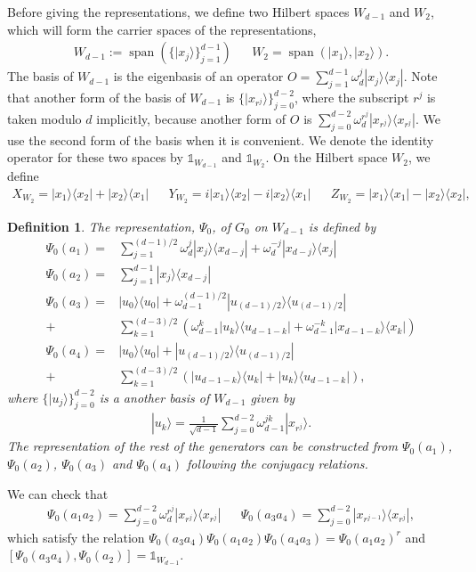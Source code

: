 \documentclass[11pt,letterpaper]{article}
\newcommand{\ket}[1]{|#1\rangle}
\newcommand{\ketbra}[2]{|#1\rangle\langle#2|}
\DeclareMathOperator{\spn}{span}
\newcommand{\1}{\mathbb{1}}
\newtheorem{definition}[theorem]{Definition}
\theoremstyle{definition}
\begin{document}
Before giving the representations, we define two Hilbert spaces $W_{d-1}$ and $W_2$, which will form the carrier spaces
of the representations,
\begin{align}
	\label{eq:w_subspace}
	W_{d-1} := \spn(\{\ket{x_j}\}_{j=1}^{d-1}) && W_2 = \spn(\ket{x_1}, \ket{x_2}).
\end{align}
The basis of $W_{d-1}$ is the eigenbasis of an operator $O = \sum_{j=1}^{d-1} \omega_d^j \ketbra{x_j}{x_j}$.
Note that another form of the basis of $W_{d-1}$ is $\{\ket{x_{r^j}}\}_{j=0}^{d-2}$, where the subscript $r^j$ is taken
modulo $d$ implicitly,
because another form of $O$ is $\sum_{j=0}^{d-2} \omega_d^{r^j} \ketbra{x_{r^j}}{x_{r^j}}$.
We use the second form of the basis when it is convenient.
We denote the identity operator for these two spaces by $\1_{W_{d-1}}$ and $\1_{W_2}$.
On the Hilbert space $W_2$, we define
\begin{align*}
	X_{W_2} = \ketbra{x_1}{x_2} + \ketbra{x_2}{x_1} &&
	Y_{W_2} = i\ketbra{x_1}{x_2} - i \ketbra{x_2}{x_1} &&
	Z_{W_2} = \ketbra{x_1}{x_1} - \ketbra{x_2}{x_2},
\end{align*}
\begin{definition}
The representation, $\Psi_0$, of $G_0$ on $W_{d-1}$ is defined by
\begin{align*}
	\Psi_0(a_1) =&\sum_{j=1}^{(d-1)/2} \omega_d^j \ketbra{x_j}{x_{d-j}} + \omega_d^{-j} \ketbra{x_{d-j}}{x_{j}} \\
	\Psi_0(a_2) = &\sum_{j=1}^{d-1} \ketbra{x_j}{x_{d-j}}\\
	\Psi_0(a_3) = &\ketbra{u_0}{u_0} +\omega_{d-1}^{(d-1)/2}\ketbra{u_{(d-1)/2}}{u_{(d-1)/2}}\\ + 
	&\sum_{k=1}^{(d-3)/2}\left( \omega_{d-1}^k\ketbra{u_k}{u_{d-1-k}} + \omega_{d-1}^{-k}\ketbra{x_{d-1-k}}{x_k}\right)\\ 
	\Psi_0(a_4) = &\ketbra{u_0}{u_0} +\ketbra{u_{(d-1)/2}}{u_{(d-1)/2}} \\+
	 &\sum_{k=1}^{(d-3)/2}\left(\ketbra{u_{d-1-k}}{u_k} + \ketbra{u_k}{u_{d-1-k}}\right),
\end{align*}
where $\{ \ket{u_j} \}_{j=0}^{d-2}$ is a another basis of $W_{d-1}$ given by
\begin{align*}
	\ket{u_k} = \frac{1}{\sqrt{d-1}} \sum_{j=0}^{d-2} \omega_{d-1}^{jk} \ket{x_{r^j}}.
\end{align*}
The representation of the rest of the generators
can be constructed from $\Psi_0(a_1)$, $\Psi_0(a_2)$, $\Psi_0(a_3)$ and $\Psi_0(a_4)$ following the 
conjugacy relations.
\end{definition}
We can check that
\begin{align*}
	\Psi_0(a_1a_2) =  \sum_{j=0}^{d-2} \omega_d^{r^j} \ketbra{x_{r^j}}{x_{r^j}} &&
	\Psi_0(a_3a_4) =  \sum_{j=0}^{d-2} \ketbra{x_{r^{j-1}}}{x_{r^j}},
\end{align*}
which satisfy the relation $\Psi_0(a_3a_4) \Psi_0(a_1a_2) \Psi_0(a_4a_3) = \Psi_0(a_1a_2)^r$ and
$[\Psi_0(a_3a_4), \Psi_0(a_2)] = \1_{W_{d-1}}$. 
\end{document}
